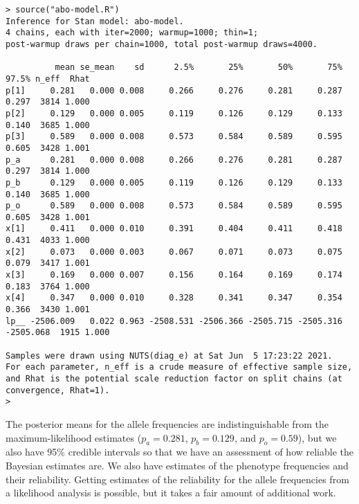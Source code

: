 {\footnotesize
\begin{verbatim}
> source("abo-model.R")
Inference for Stan model: abo-model.
4 chains, each with iter=2000; warmup=1000; thin=1; 
post-warmup draws per chain=1000, total post-warmup draws=4000.

          mean se_mean    sd      2.5%       25%       50%       75%     97.5% n_eff  Rhat
p[1]     0.281   0.000 0.008     0.266     0.276     0.281     0.287     0.297  3814 1.000
p[2]     0.129   0.000 0.005     0.119     0.126     0.129     0.133     0.140  3685 1.000
p[3]     0.589   0.000 0.008     0.573     0.584     0.589     0.595     0.605  3428 1.001
p_a      0.281   0.000 0.008     0.266     0.276     0.281     0.287     0.297  3814 1.000
p_b      0.129   0.000 0.005     0.119     0.126     0.129     0.133     0.140  3685 1.000
p_o      0.589   0.000 0.008     0.573     0.584     0.589     0.595     0.605  3428 1.001
x[1]     0.411   0.000 0.010     0.391     0.404     0.411     0.418     0.431  4033 1.000
x[2]     0.073   0.000 0.003     0.067     0.071     0.073     0.075     0.079  3417 1.001
x[3]     0.169   0.000 0.007     0.156     0.164     0.169     0.174     0.183  3764 1.000
x[4]     0.347   0.000 0.010     0.328     0.341     0.347     0.354     0.366  3430 1.001
lp__ -2506.009   0.022 0.963 -2508.531 -2506.366 -2505.715 -2505.316 -2505.068  1915 1.000

Samples were drawn using NUTS(diag_e) at Sat Jun  5 17:23:22 2021.
For each parameter, n_eff is a crude measure of effective sample size,
and Rhat is the potential scale reduction factor on split chains (at 
convergence, Rhat=1).
>
\end{verbatim}
}
\noindent The posterior means for the allele frequencies are indistinguishable
from the maximum-likelihood estimates ($p_a = 0.281$, $p_b = 0.129$,
and $p_o = 0.59$), but we also have 95\% credible intervals so that we
have an assessment of how reliable the Bayesian estimates are. We also
have estimates of the phenotype frequencies and their
reliability. Getting estimates of the reliability for the allele
frequencies from a likelihood analysis is possible, but it takes a
fair amount of additional work.

